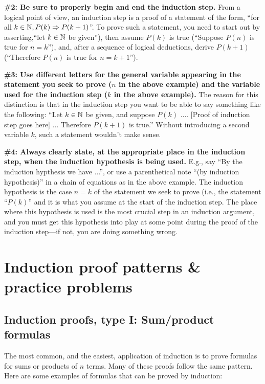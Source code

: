 \noindent
\textbf{\#2: Be sure to properly begin and end the induction step.} 
From a logical point of view, an induction step is a proof of a statement of the
form, ``for all  $ k\in\mathbb{N}, P(k)\Rightarrow P(k+1)$''. To prove such a statement,
you need to start out by asserting,``let $k\in \mathbb{N}$ be
given''), then assume $P(k)$ is true (``Suppose $P(n)$ is true for $n=k$''), 
and, after a sequence of logical deductions, derive $P(k+1)$ (``Therefore
$P(n)$ is true for $n=k+1$''). 

\noindent
 \textbf{\#3: Use different letters for the general variable appearing in the
statement you seek to prove ($n$ in the above example)
and the variable used for the induction step 
($k$ in the above example).} 
The reason for this distinction is that in the induction step 
you want to be able to say something like the following:
``Let $k\in\mathbb{N}$ be given, and suppose $P(k)$ .... 
[Proof of induction step goes here] ...  
Therefore $P(k+1)$ is true.''  Without introducing a second variable
$k$, such a statement wouldn't make sense.

\noindent
\textbf{\#4: Always clearly state, at the appropriate place in the induction step,
when the induction hypothesis is being used.} E.g., say
``By the induction hypthesis we have ...'', or use a parenthetical
note ``(by induction hypothesis)'' in a chain of equations as in the above
example.  The induction hypothesis is the case $n=k$ of the statement we seek
to prove (i.e., the statement ``$P(k)$'' and it is what you assume at the
start of the induction step.  The place where this hypothesis is used is the
most crucial step in an induction argument, and you must get this hypothesis into
play at some point during the proof of the induction step---if not, you are
doing something wrong. 


\section{Induction proof patterns \& practice problems} 



\subsection*{Induction proofs, type I: Sum/product formulas}
 
The most common, and the easiest, application of induction is to prove
formulas for sums or products of $n$ terms. Many of these  proofs follow
the same pattern. Here are  some examples of formulas that can be proved by induction:

